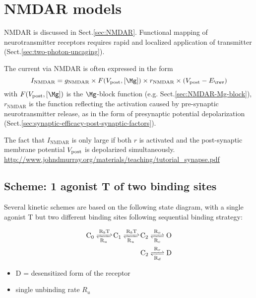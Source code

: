 \chapter{NMDAR models}
\label{chap:NMDAR_models}

\def\syn{{\text{syn}}}
\def\decay{{\text{decay}}}
\def\rise{{\text{rise}}}
\def\nonNMDA{{\text{non-NMDA}}}
\def\NMDA{{\text{NMDAR}}}
\def\on{{\text{on}}}
\def\off{{\text{off}}}
\def\slope{{\text{slope}}}

NMDAR is discussed in Sect.\ref{sec:NMDAR}.
Functional mapping of neurotransmitter receptors requires rapid and localized
application of transmitter (Sect.\ref{sec:two-photon-uncaging}).

The current via NMDAR is often expressed in the form
\begin{equation}
I_\NMDA = g_\NMDA  \times F(V_\post,[\Mg]) \times r_\NMDA
  \times \left( V_\post - E_\rev \right)
\end{equation}
with $F(V_\post, [\Mg])$ is the $\Mg$-block function (e.g.
Sect.\ref{sec:NMDAR-Mg-block}), $r_\NMDA$ is the function reflecting the
activation caused by pre-synaptic neurotransmitter release, as in the
form of presynaptic potential depolarization (Sect.\ref{sec:synaptic-efficacy-post-synaptic-factors}).

The fact that $I_\NMDA$ is only large if both $r$ is activated and the
post-synaptic membrane potential $V_{\text{post}}$ is depolarized simultaneously.
\url{http://www.johndmurray.org/materials/teaching/tutorial_synapse.pdf}


\section{Scheme: 1 agonist T of two binding sites}

Several kinetic schemes are based on the following state diagram, with a single
agonist T but two different binding sites following sequential binding strategy:

\begin{equation}
\begin{split}
\ce{ C_0 <=>[R_bT][R_u] C_1 <=>[R_bT][R_u] C_2 <=>[R_o][R_c] O} \\
\ce{ C_2 <=>[R_r][R_d] D}
\end{split}
\end{equation}

\begin{itemize}
  \item D = desensitized form of the receptor
  
  \item single unbinding rate $R_u$
\end{itemize}

